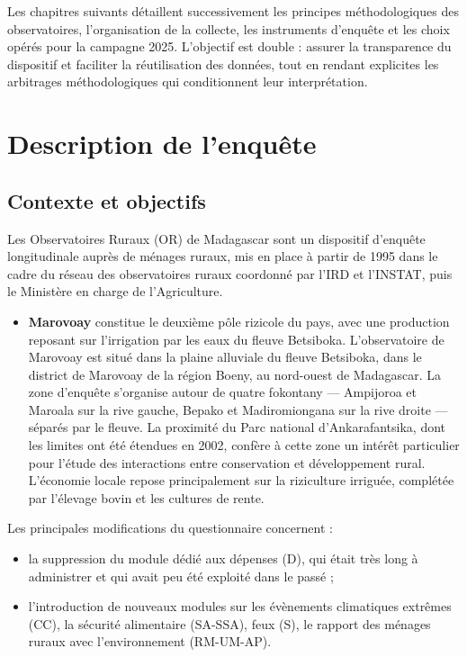 \documentclass[
  french,
  letterpaper,
]{report}
\providecommand{\tightlist}{%
  \setlength{\itemsep}{0pt}\setlength{\parskip}{0pt}}
\begin{document}
Les chapitres suivants détaillent successivement les principes
méthodologiques des observatoires, l'organisation de la collecte, les
instruments d'enquête et les choix opérés pour la campagne 2025.
L'objectif est double : assurer la transparence du dispositif et
faciliter la réutilisation des données, tout en rendant explicites les
arbitrages méthodologiques qui conditionnent leur interprétation.


\chapter{Description de l'enquête}\label{description-de-lenquuxeate}

\section{Contexte et objectifs}\label{contexte-et-objectifs}

Les Observatoires Ruraux (OR) de Madagascar sont un dispositif d'enquête
longitudinale auprès de ménages ruraux, mis en place à partir de 1995
dans le cadre du réseau des observatoires ruraux coordonné par l'IRD et
l'INSTAT, puis le Ministère en charge de l'Agriculture.

\begin{itemize}
\tightlist
\item
  \textbf{Marovoay} constitue le deuxième pôle rizicole du pays, avec
  une production reposant sur l'irrigation par les eaux du fleuve
  Betsiboka. L'observatoire de Marovoay est situé dans la plaine
  alluviale du fleuve Betsiboka, dans le district de Marovoay de la
  région Boeny, au nord-ouest de Madagascar. La zone d'enquête
  s'organise autour de quatre fokontany --- Ampijoroa et Maroala sur la
  rive gauche, Bepako et Madiromiongana sur la rive droite --- séparés
  par le fleuve. La proximité du Parc national d'Ankarafantsika, dont
  les limites ont été étendues en 2002, confère à cette zone un intérêt
  particulier pour l'étude des interactions entre conservation et
  développement rural. L'économie locale repose principalement sur la
  riziculture irriguée, complétée par l'élevage bovin et les cultures de
  rente.
\end{itemize}

Les principales modifications du questionnaire concernent :

\begin{itemize}
\item
  la suppression du module dédié aux dépenses (D), qui était très long à
  administrer et qui avait peu été exploité dans le passé ;
\item
  l'introduction de nouveaux modules sur les évènements climatiques
  extrêmes (CC), la sécurité alimentaire (SA-SSA), feux (S), le rapport
  des ménages ruraux avec l'environnement (RM-UM-AP).
\end{itemize}
\end{document}
